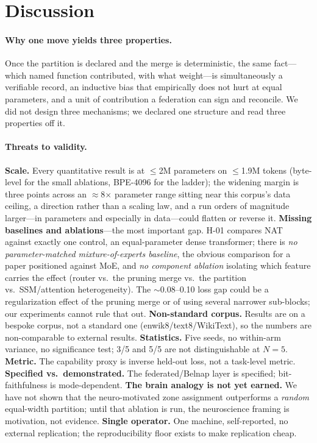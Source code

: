 \documentclass[11pt]{article}
\begin{document}
\section{Discussion}\label{sec:disc}

\paragraph{Why one move yields three properties.}
Once the partition is declared and the merge is deterministic, the same fact---which named function
contributed, with what weight---is simultaneously a verifiable record, an inductive bias that
empirically does not hurt at equal parameters, and a unit of contribution a federation can sign and
reconcile. We did not design three mechanisms; we declared one structure and read three properties
off it.

\paragraph{Threats to validity.}
\textbf{Scale.} Every quantitative result is at $\le$2M parameters on $\le$1.9M tokens (byte-level for
the small ablations, BPE-4096 for the ladder); the widening margin is three points across an
$\approx$8$\times$ parameter range sitting near this corpus's data ceiling, a direction rather than a
scaling law, and a run orders of magnitude larger---in parameters and especially in data---could flatten
or reverse it. \textbf{Missing baselines and ablations}---the most important
gap. H-01 compares NAT against exactly one control, an equal-parameter dense transformer; there is
\emph{no parameter-matched mixture-of-experts baseline}, the obvious comparison for a paper positioned
against MoE, and \emph{no component ablation} isolating which feature carries the effect (router vs.\
the pruning merge vs.\ the partition vs.\ SSM/attention heterogeneity). The $\sim$0.08--0.10 loss gap
could be a regularization effect of the pruning merge or of using several narrower sub-blocks; our
experiments cannot rule that out. \textbf{Non-standard corpus.} Results are on a bespoke corpus, not
a standard one (enwik8/text8/WikiText), so the numbers are non-comparable to external results.
\textbf{Statistics.} Five seeds, no within-arm variance, no significance test; 3/5 and 5/5 are not
distinguishable at $N{=}5$. \textbf{Metric.} The capability proxy is inverse held-out loss, not a
task-level metric. \textbf{Specified vs.\ demonstrated.} The federated/Belnap layer is specified;
bit-faithfulness is mode-dependent. \textbf{The brain analogy is not yet earned.} We have not shown
that the neuro-motivated zone assignment outperforms a \emph{random} equal-width partition; until that
ablation is run, the neuroscience framing is motivation, not evidence. \textbf{Single operator.} One
machine, self-reported, no external replication; the reproducibility floor exists to make replication
cheap.
\end{document}
